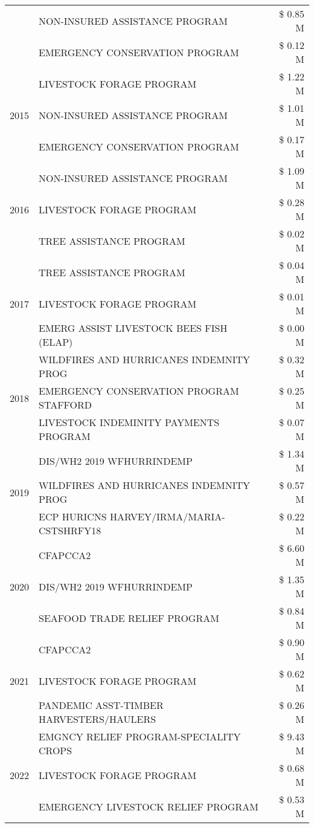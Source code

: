 \begin{tabular}{llr}
 & NON-INSURED ASSISTANCE PROGRAM & \$ 0.85 M \\
 & EMERGENCY CONSERVATION PROGRAM & \$ 0.12 M \\
\cline{1-3}
\multirow[t]{3}{*}{2015} & LIVESTOCK FORAGE PROGRAM & \$ 1.22 M \\
 & NON-INSURED ASSISTANCE PROGRAM & \$ 1.01 M \\
 & EMERGENCY CONSERVATION PROGRAM & \$ 0.17 M \\
\cline{1-3}
\multirow[t]{3}{*}{2016} & NON-INSURED ASSISTANCE PROGRAM & \$ 1.09 M \\
 & LIVESTOCK FORAGE PROGRAM & \$ 0.28 M \\
 & TREE ASSISTANCE PROGRAM & \$ 0.02 M \\
\cline{1-3}
\multirow[t]{3}{*}{2017} & TREE ASSISTANCE PROGRAM & \$ 0.04 M \\
 & LIVESTOCK FORAGE PROGRAM & \$ 0.01 M \\
 & EMERG ASSIST LIVESTOCK BEES FISH (ELAP) & \$ 0.00 M \\
\cline{1-3}
\multirow[t]{3}{*}{2018} & WILDFIRES AND HURRICANES INDEMNITY PROG & \$ 0.32 M \\
 & EMERGENCY CONSERVATION PROGRAM STAFFORD & \$ 0.25 M \\
 & LIVESTOCK INDEMINITY PAYMENTS PROGRAM & \$ 0.07 M \\
\cline{1-3}
\multirow[t]{3}{*}{2019} & DIS/WH2 2019 WFHURRINDEMP & \$ 1.34 M \\
 & WILDFIRES AND HURRICANES INDEMNITY PROG & \$ 0.57 M \\
 & ECP HURICNS HARVEY/IRMA/MARIA-CSTSHRFY18 & \$ 0.22 M \\
\cline{1-3}
\multirow[t]{3}{*}{2020} & CFAPCCA2 & \$ 6.60 M \\
 & DIS/WH2 2019 WFHURRINDEMP & \$ 1.35 M \\
 & SEAFOOD TRADE RELIEF PROGRAM & \$ 0.84 M \\
\cline{1-3}
\multirow[t]{3}{*}{2021} & CFAPCCA2 & \$ 0.90 M \\
 & LIVESTOCK FORAGE PROGRAM & \$ 0.62 M \\
 & PANDEMIC ASST-TIMBER HARVESTERS/HAULERS & \$ 0.26 M \\
\cline{1-3}
\multirow[t]{3}{*}{2022} & EMGNCY RELIEF PROGRAM-SPECIALITY CROPS & \$ 9.43 M \\
 & LIVESTOCK FORAGE PROGRAM & \$ 0.68 M \\
 & EMERGENCY LIVESTOCK RELIEF PROGRAM & \$ 0.53 M \\
\cline{1-3}
\bottomrule
\end{tabular}
